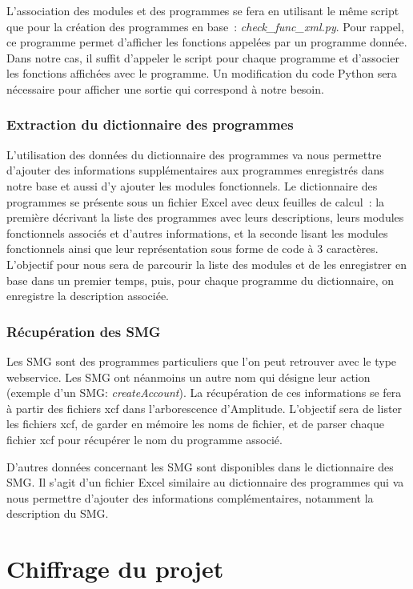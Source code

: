 \documentclass{polytech/polytech}
\begin{document}
L’association des modules et des programmes se fera en utilisant le même script que pour la création des programmes en base : \textit{check\_func\_xml.py}. Pour rappel, ce programme permet d’afficher les fonctions appelées par un programme donnée. Dans notre cas, il suffit d’appeler le script pour chaque programme et d’associer les fonctions affichées avec le programme. Un modification du code Python sera nécessaire pour afficher une sortie qui correspond à notre besoin.


\subsection{Extraction du dictionnaire des programmes}

L’utilisation des données du dictionnaire des programmes va nous permettre d’ajouter des informations supplémentaires aux programmes enregistrés dans notre base et aussi d’y ajouter les modules fonctionnels. Le dictionnaire des programmes se présente sous un fichier Excel avec deux feuilles de calcul : la première décrivant la liste des programmes avec leurs descriptions, leurs modules fonctionnels associés et d’autres informations, et la seconde lisant les modules fonctionnels ainsi que leur représentation sous forme de code à 3 caractères. L’objectif pour nous sera de parcourir la liste des modules et de les enregistrer en base dans un premier temps, puis, pour chaque programme du dictionnaire, on enregistre la description associée. 


\subsection{Récupération des SMG}

Les SMG sont des programmes particuliers que l’on peut retrouver avec le type webservice. Les SMG ont néanmoins un autre nom qui désigne leur action (exemple d’un SMG: \textit{createAccount}). La récupération de ces informations se fera à partir des fichiers xcf dans l’arborescence d’Amplitude. L’objectif sera de lister les fichiers xcf, de garder en mémoire les noms de fichier, et de parser chaque fichier xcf pour récupérer le nom du programme associé. 

D’autres données concernant les SMG sont disponibles dans le dictionnaire des SMG. Il s’agit d’un fichier Excel similaire au dictionnaire des programmes qui va nous permettre d’ajouter des informations complémentaires, notamment la description du SMG. 


\chapter{Chiffrage du projet}
\end{document}
